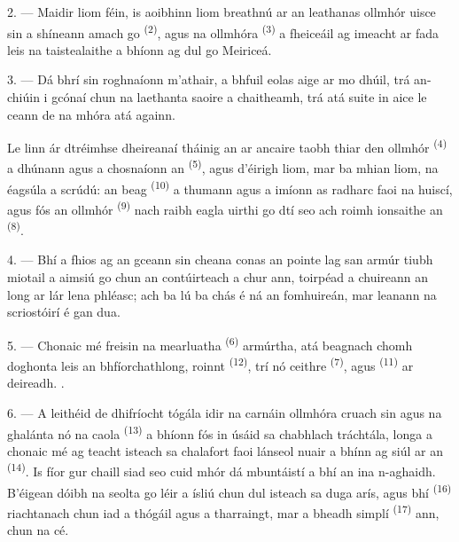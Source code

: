 2. --- Maidir liom féin, is aoibhinn liom breathnú ar an leathanas ollmhór uisce sin
a shíneann amach go  \textsuperscript{(2)}, agus na
 ollmhóra \textsuperscript{(3)} a fheiceáil ag imeacht ar
 fada leis na taistealaithe a bhíonn ag dul go Meiriceá.

3. --- Dá bhrí sin roghnaíonn m'athair, a bhfuil eolas aige ar mo dhúil, trá
an-chiúin i gcónaí chun na laethanta saoire a chaitheamh, trá atá suite in aice le
ceann de na  mhóra atá againn.

Le linn ár dtréimhse dheireanaí tháinig an  ar ancaire taobh thiar
den  ollmhór \textsuperscript{(4)} a dhúnann agus a chosnaíonn
an  \textsuperscript{(5)}, agus d'éirigh liom, mar ba mhian
liom, na  éagsúla a scrúdú: an  beag
\textsuperscript{(10)} a thumann agus a imíonn as radharc faoi na huiscí, agus fós an
 ollmhór \textsuperscript{(9)} nach raibh eagla uirthi go dtí seo ach
roimh ionsaithe an  \textsuperscript{(8)}.

\VUsaut{3.0mm}
\VUsaut{3.0mm}

4. --- Bhí a fhios ag an gceann sin cheana conas an pointe lag san armúr tiubh
miotail a aimsiú go  chun an  contúirteach a chur
ann, toirpéad a chuireann an long ar lár lena phléasc; ach ba lú ba chás é ná an
fomhuireán, mar leanann na scriostóirí é gan dua.

5. --- Chonaic mé freisin na  mearluatha \textsuperscript{(6)}
armúrtha, atá beagnach chomh doghonta leis an bhfíorchathlong, roinnt  \textsuperscript{(12)}, trí nó ceithre 
\textsuperscript{(7)}, agus  \textsuperscript{(11)} ar deireadh.
.

6. --- A leithéid de dhifríocht tógála idir na carnáin ollmhóra cruach sin agus na
 ghalánta nó na  caola \textsuperscript{(13)}
a bhíonn fós in úsáid sa chabhlach tráchtála, longa a chonaic mé ag teacht isteach sa
chalafort faoi lánseol nuair a bhínn ag siúl ar an 
\textsuperscript{(14)}. Is fíor gur chaill siad seo cuid mhór dá mbuntáistí
 a bhí an  ina n-aghaidh. B'éigean dóibh na seolta go
léir a ísliú chun dul isteach sa duga arís, agus bhí 
\textsuperscript{(16)} riachtanach chun iad a thógáil agus a tharraingt, mar a bheadh
 simplí \textsuperscript{(17)} ann, chun na cé.


